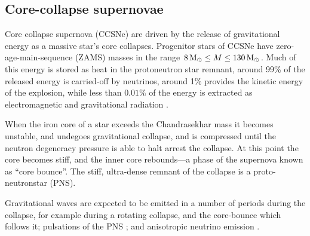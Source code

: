 
\subsection{Core-collapse supernovae}
\label{sec:core-coll-supern}



Core collapse supernova (CCSNe) are driven by the release of
gravitational energy as a massive star's core collapses. Progenitor
stars of CCSNe have zero-age-main-sequence (ZAMS) masses in the range
$8\,\mathrm{M{_\odot}} \leq M \leq 130\,\mathrm{M{_\odot}}$. Much of this energy is stored
as heat in the protoneutron star remnant, around 99\% of the released
energy is carried-off by neutrinos, around 1\% provides the kinetic
energy of the explosion, while less than $0.01\%$ of the energy is
extracted as electromagnetic and gravitational radiation
\cite{2009CQGra..26f3001O}.

When the iron core of a star exceeds the Chandrasekhar mass it becomes
unstable, and undegoes gravitational collapse, and is compressed until
the neutron degeneracy pressure is able to halt arrest the
collapse. At this point the core becomes stiff, and the inner core
rebounds---a phase of the supernova known as ``core bounce''. The
stiff, ultra-dense remnant of the collapse is a proto-neutronstar
(PNS).

Gravitational waves are expected to be emitted in a number of periods
during the collapse, for example during a rotating collapse, and the
core-bounce which follows it; pulsations of the PNS
\cite{1966ApJ...145..514M}; and anisotropic neutrino emission
\cite{1979ApJ...231Q.644E,1978ApJ...223.1037E,1978Natur.274..565T}.

